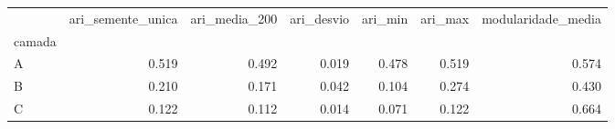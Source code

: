 \begin{tabular}{lrrrrrr}
\toprule
 & ari\_semente\_unica & ari\_media\_200 & ari\_desvio & ari\_min & ari\_max & modularidade\_media \\
camada &  &  &  &  &  &  \\
\midrule
A & 0.519 & 0.492 & 0.019 & 0.478 & 0.519 & 0.574 \\
B & 0.210 & 0.171 & 0.042 & 0.104 & 0.274 & 0.430 \\
C & 0.122 & 0.112 & 0.014 & 0.071 & 0.122 & 0.664 \\
\bottomrule
\end{tabular}
